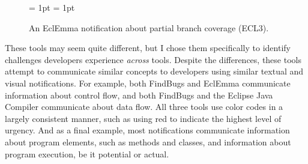 \begin{figure} [t]
\subfigcapskip = 1pt
\centering
{}
\subfigcapskip = 1pt

\caption{An EclEmma notification about partial branch coverage (ECL3).}
\label{fig:notificationECL}
\end{figure} 

These tools may seem quite different, but I chose them
specifically to identify challenges developers experience \emph{across} tools.
Despite the differences, these tools attempt to communicate similar concepts to developers using similar textual and visual notifications.
For example, both FindBugs and EclEmma communicate information about 
control flow, and both FindBugs and the Eclipse Java Compiler communicate about data flow.
All three tools use color codes in a largely consistent manner, 
such as using red to indicate the highest level of urgency.
And as a final example, most notifications communicate information about program elements, such as methods and classes, and information about program execution, be it potential or actual.



